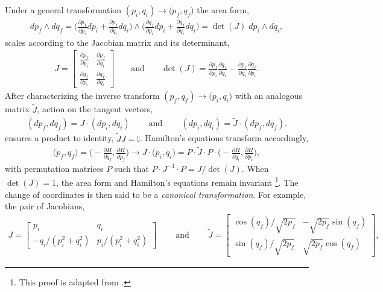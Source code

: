 \documentclass[nofootinbib,preprint]{revtex4-1}
\begin{document}
Under a general transformation $(p_i,q_i) \rightarrow \big(p_f,q_f\big)$ the area form,
\begin{eqnarray}
dp_f \wedge dq_f = \bigg(\frac{\partial p_f}{\partial  p_i}dp_i+\frac{\partial p_f}{\partial q_i}dq_i\bigg)
\wedge\bigg(\frac{\partial q_f}{\partial p_i}dp_i+\frac{\partial q_f}{\partial q_i}dq_i\bigg)
=\det(J) \; dp_i \wedge dq_i,  \nonumber
\end{eqnarray}
scales according to the Jacobian matrix and its determinant,
\begin{eqnarray}
J= \begin{bmatrix}
\frac{\partial p_f}{\partial p_i} & \frac{\partial p_f}{\partial q_i} \\
\frac{\partial q_f}{\partial p_i} & \frac{\partial q_f}{\partial q_i}
\end{bmatrix} \;\;\;\;\;\;\; \text{and} \;\;\;\;\;\;\; 
\det(J) = \frac{\partial p_f}{\partial p_i}\frac{\partial q_f}{\partial q_i}
 - \frac{\partial p_f}{\partial q_i}\frac{\partial q_f}{\partial p_i}. 
\nonumber 
\end{eqnarray}
After characterizing the inverse transform $(p_f,q_f) \rightarrow \big(p_i,q_i\big)$ 
with an analogous matrix $\widetilde{J}$, action on the tangent vectors,
\begin{eqnarray}
(dp_f,dq_f)= J \cdot (dp_i,dq_i) 
\;\;\;\;\;\;\;\; \text{and} \;\;\;\;\;\;\;\;
(dp_i,dq_i)= \widetilde{J} \cdot (dp_f,dq_f). \nonumber
\end{eqnarray}
ensures a product to identity, $\widetilde{J}J=\mathbb{I}$. Hamilton's equations 
transform accordingly,
\begin{eqnarray}
\big(\dot{p}_f,\dot{q}_f \big) = \bigg(-\frac{\partial H}{\partial q_f},\frac{\partial H}{\partial p_f}\bigg)   
\longrightarrow J \cdot \big(\dot{p}_i,\dot{q}_i \big) = 
P\cdot \widetilde{J} \cdot P \cdot \bigg(-\frac{\partial H}{\partial q_i},\frac{\partial H}{\partial p_i}\bigg),
\nonumber 
\end{eqnarray}
with permutation matrices $P$ such that $P \cdot J^{-1} \cdot P = J/\det(J)$. When 
$\det(J)=1$, the area form and Hamilton's equations remain invariant
\footnote{This proof is adapted from \cite{RALSTON1989}.}. The change of coordinates is 
then said to be a \textit{canonical transformation}. For example, the pair of Jacobians,
\begin{eqnarray}
J =  \begin{bmatrix} p_i & q_i \\
-q_i/(p_i^2+q_i^2) & p_i/(p_i^2+q_i^2)
\end{bmatrix}  \;\;\;\;\;\;\;\; \text{and}  \;\;\;\;\;\;\;\; 
\widetilde{J} = \begin{bmatrix} \cos(q_f)/\sqrt{2p_f} & -\sqrt{2p_f}\sin(q_f) \\
\sin(q_f)/\sqrt{2p_f} & \sqrt{2p_f}\cos(q_f) \end{bmatrix}\nonumber,
\end{eqnarray}
\end{document}
